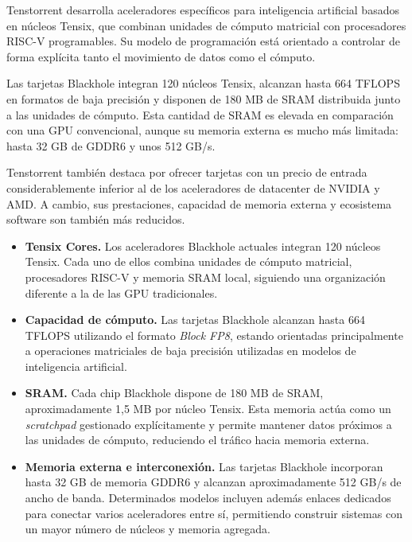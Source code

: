 Tenstorrent desarrolla aceleradores específicos para inteligencia artificial basados en núcleos Tensix, que combinan unidades de cómputo matricial con procesadores RISC-V programables. Su modelo de programación está orientado a controlar de forma explícita tanto el movimiento de datos como el cómputo. \cite{tenstorrentMetal}

Las tarjetas Blackhole integran 120 núcleos Tensix, alcanzan hasta 664 TFLOPS en formatos de baja precisión y disponen de 180 MB de SRAM distribuida junto a las unidades de cómputo. Esta cantidad de SRAM es elevada en comparación con una GPU convencional, aunque su memoria externa es mucho más limitada: hasta 32 GB de GDDR6 y unos 512 GB/s.

Tenstorrent también destaca por ofrecer tarjetas con un precio de entrada considerablemente inferior al de los aceleradores de datacenter de NVIDIA y AMD. A cambio, sus prestaciones, capacidad de memoria externa y ecosistema software son también más reducidos.

\begin{itemize}

\item \textbf{Tensix Cores.}
Los aceleradores Blackhole actuales integran 120 núcleos Tensix. Cada uno de ellos combina unidades de cómputo matricial, procesadores RISC-V y memoria SRAM local, siguiendo una organización diferente a la de las GPU tradicionales.

\item \textbf{Capacidad de cómputo.}
Las tarjetas Blackhole alcanzan hasta 664 TFLOPS utilizando el formato \textit{Block FP8}, estando orientadas principalmente a operaciones matriciales de baja precisión utilizadas en modelos de inteligencia artificial.

\item \textbf{SRAM.}
Cada chip Blackhole dispone de 180 MB de SRAM, aproximadamente 1,5 MB por núcleo Tensix. Esta memoria actúa como un \textit{scratchpad} gestionado explícitamente y permite mantener datos próximos a las unidades de cómputo, reduciendo el tráfico hacia memoria externa.

\item \textbf{Memoria externa e interconexión.}
Las tarjetas Blackhole incorporan hasta 32 GB de memoria GDDR6 y alcanzan aproximadamente 512 GB/s de ancho de banda. Determinados modelos incluyen además enlaces dedicados para conectar varios aceleradores entre sí, permitiendo construir sistemas con un mayor número de núcleos y memoria agregada.

\end{itemize}

